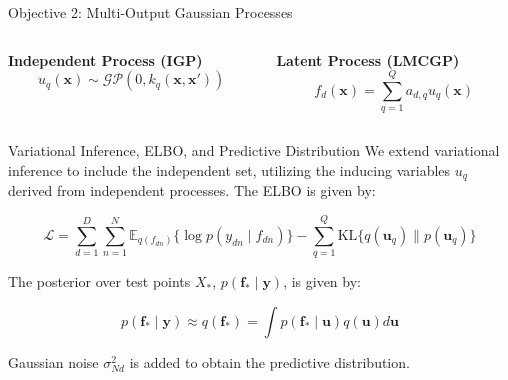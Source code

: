 \begin{frame}{Objective 2: Multi-Output Gaussian Processes}
	\centering
	\setlength{} 
	\setlength{}
	
	
	\begin{columns}[T] %

		\begin{column}{0.5\textwidth}
			\centering
	\textcolor{mygreen}{
		\textbf{Independent Process (IGP)}
		\begin{equation*}
			u_{q}(\mathbf{x}) \sim \mathcal{GP}(0, k_{q}(\mathbf{x}, \mathbf{x}'))
		\end{equation*}
	}
	\end{column}
	
	
	\begin{column}{0.5\textwidth}
		\centering
		\textcolor{myblue}{
			\textbf{Latent Process (LMCGP)}
			\begin{equation*}
				f_{d}(\mathbf{x}) = \sum_{q=1}^Q a_{d,q} u_{q}(\mathbf{x})
			\end{equation*}	
		}
	\end{column}
	
	\end{columns}
\end{frame}


\begin{frame}{Variational Inference, ELBO, and Predictive Distribution}
	We extend variational inference to include the independent set, utilizing the inducing variables $u_q$ derived from independent processes. The ELBO is given by:
	
	\begin{equation*}\label{eq:lmc_elbo}
		\mathcal{L} = \sum_{d=1}^D\sum_{n=1}^{N} \mathbb{E}_{q(f_{dn})}\{\log p(y_{dn} \mid f_{dn})\} - \sum_{q=1}^Q \text{KL}\{q(\mathbf{u}_q)\parallel p(\mathbf{u}_q)\}
	\end{equation*}
	
	The posterior over test points $X_*$, $p(\mathbf{f}_* \mid \mathbf{y})$, is given by:
	
	\begin{equation*}
		p(\mathbf{f}_* \mid \mathbf{y}) \approx q(\mathbf{f}_*) = \int p(\mathbf{f}_* \mid \mathbf{u}) q(\mathbf{u}) d \mathbf{u}
	\end{equation*}
	
	Gaussian noise $\sigma_{Nd}^2$ is added to obtain the predictive distribution.
\end{frame}

